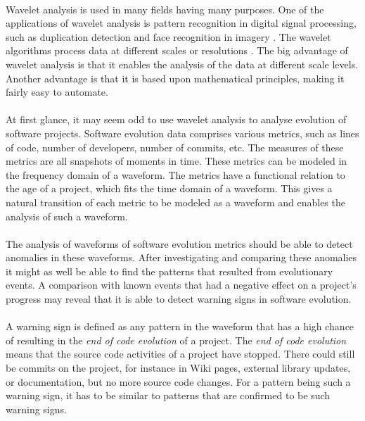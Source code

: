 \paragraph{}
Wavelet analysis is used in many fields having many purposes. One of the
applications of wavelet analysis is pattern recognition in digital signal
processing, such as duplication detection and face recognition in imagery
\cite{myna, wadkar}. The wavelet algorithms process data at different scales or
resolutions \cite{graps}. The big advantage of wavelet analysis is that
it enables the analysis of the data at different scale levels. Another
advantage is that it is based upon mathematical principles, making it fairly
easy to automate.

\paragraph{}
At first glance, it may seem odd to use wavelet analysis to analyse evolution of
software projects. Software evolution data comprises various metrics, such as
lines of code, number of developers, number of commits, etc. The measures of
these metrics are all snapshots of moments in time. These metrics can be
modeled in the frequency domain of a waveform. The metrics have a functional
relation to the age of a project, which fits the time domain of a waveform.
This gives a natural transition of each metric to be modeled as a waveform and
enables the analysis of such a waveform.

\paragraph{}
The analysis of waveforms of software evolution metrics should be able to
detect anomalies in these waveforms. After investigating and comparing these
anomalies it might as well be able to find the patterns that resulted from
evolutionary events. A comparison with known events that had a negative effect
on a project's progress may reveal that it is able to detect warning signs in
software evolution.

\paragraph{}
A warning sign is defined as any pattern in the waveform that has a high chance
of resulting in the \emph{end of code evolution }\rm of a project. The
\emph{end of code evolution }\rm means that the source code activities of a
project have stopped. There could still be commits on the project, for instance
in Wiki pages, external library updates, or documentation, but no more source
code changes. For a pattern being such a warning sign, it has to be similar to
patterns that are confirmed to be such warning signs.\\[1ex]

